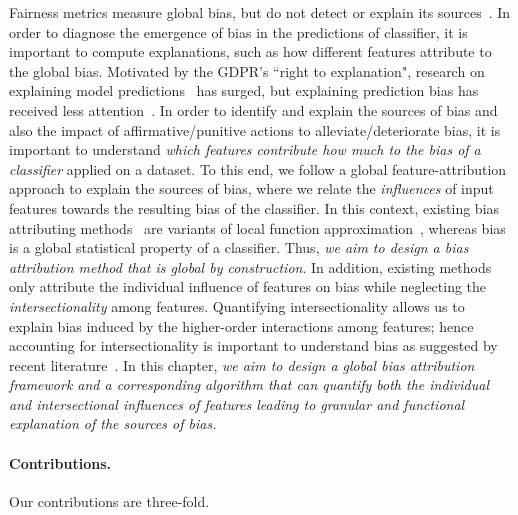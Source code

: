 Fairness metrics measure global bias, but do not detect or explain its sources~\cite{begley2020explainability,lundberg2020explaining,pan2021explaining}.
In order to diagnose the emergence of bias in the predictions of classifier, it is important to compute explanations, such as how different features attribute to the global bias. Motivated by the GDPR's ``right to explanation", research on explaining model predictions~\cite{ribeiro2016should,lundberg2017unified,lundberg2020local2global} has surged, but explaining prediction bias has received less attention~\cite{begley2020explainability,lundberg2020explaining}. In order to identify and explain the sources of bias and also the impact of affirmative/punitive actions to alleviate/deteriorate bias, it is important to understand \textit{which features contribute how much to the bias of a classifier} applied on a dataset. To this end, we follow a global feature-attribution approach to explain the sources of bias, where we relate the \emph{influences} of input features towards the resulting bias of the classifier. In this context, existing bias attributing methods~\cite{begley2020explainability,lundberg2020explaining} are variants of local function approximation~\cite{sliwinski2019axiomatic}, whereas bias is a global statistical property of a classifier. Thus, \textit{we aim to design a bias attribution method that is global by construction}. In addition, existing methods only attribute the individual influence of features on bias while neglecting the \textit{intersectionality} among features. Quantifying intersectionality allows us to explain bias induced by the higher-order interactions among features; hence accounting for intersectionality is important to understand bias as suggested by recent literature~\cite{buolamwini2018gender,wang2022towards}. 
In this chapter, \textit{we aim to design a global bias attribution framework and a corresponding algorithm that can quantify both the individual and intersectional influences of features leading to granular and functional explanation of the sources of bias.}


\paragraph{Contributions.}  Our contributions are three-fold.

